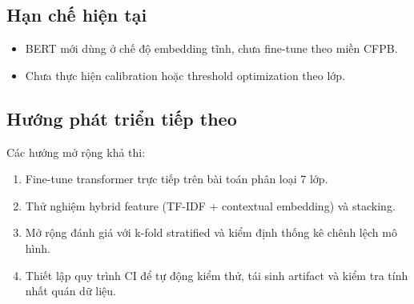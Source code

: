 \subsection{Hạn chế hiện tại}
\begin{itemize}[nosep]
    \item BERT mới dùng ở chế độ embedding tĩnh, chưa fine-tune theo miền CFPB.
    \item Chưa thực hiện calibration hoặc threshold optimization theo lớp.
\end{itemize}

\subsection{Hướng phát triển tiếp theo}
Các hướng mở rộng khả thi:
\begin{enumerate}[nosep]
    \item Fine-tune transformer trực tiếp trên bài toán phân loại 7 lớp.
    \item Thử nghiệm hybrid feature (TF-IDF + contextual embedding) và stacking.
    \item Mở rộng đánh giá với k-fold stratified và kiểm định thống kê chênh lệch mô hình.
    \item Thiết lập quy trình CI để tự động kiểm thử, tái sinh artifact và kiểm tra tính nhất quán dữ liệu.
\end{enumerate}
